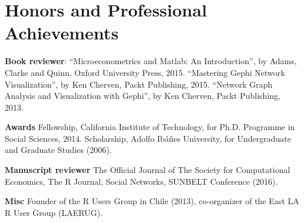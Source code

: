 \documentclass[letterpaper, 11pt]{article}
\renewenvironment{itemize}{
  \begin{list}{}{
    \setlength{\leftmargin}{0.45cm}
  }
}{
  \end{list}
}
\begin{document}
%

\section*{Honors and Professional Achievements}

\begin{itemize}
\item \textbf{Book reviewer}: ``Microeconometrics and Matlab: An Introduction'', by Adams, Clarke and Quinn, Oxford University Press, 2015. ``Mastering Gephi Network Visualization'', by Ken Cherven, Packt Publishing, 2015. ``Network Graph Analysis and Visualization with Gephi'', by Ken Cherven, Packt Publishing, 2013.
\item \textbf{Awards} Fellowship, California Institute of Technology, for Ph.D. Programme in Social Sciences, 2014. Scholarship, Adolfo Ib\'a\~nes University, for Undergraduate and Graduate Studies (2006).
\item \textbf{Manuscript reviewer} The Official Journal of The Society for Computational Economics, The R Journal, Social Networks, SUNBELT Conference (2016).
\item \textbf{Misc} Founder of the R Users Group in Chile (2013), co-organizer of the East LA R User Group (LAERUG).
\end{itemize}
\end{document}
